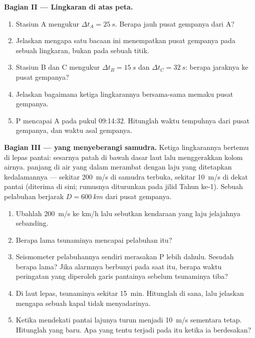 \begin{problem}
\medskip
\noindent\textbf{Bagian II --- Lingkaran di atas peta.}
\begin{enumerate}[resume]
  \item Stasiun A mengukur $\Delta t_A = \qty{25}{s}$. Berapa jauh pusat
        gempanya dari A?
  \item Jelaskan mengapa satu bacaan ini menempatkan pusat gempanya pada
        sebuah lingkaran, bukan pada sebuah titik.
  \item Stasiun B dan C mengukur $\Delta t_B = \qty{15}{s}$ dan
        $\Delta t_C = \qty{32}{s}$: berapa jaraknya ke pusat gempanya?
  \item Jelaskan bagaimana ketiga lingkarannya bersama-sama memaku pusat
        gempanya.
  \item {} P mencapai A pada pukul 09:14:32. Hitunglah waktu
        tempuhnya dari pusat gempanya, dan waktu asal gempanya.
\end{enumerate}

\medskip
\noindent\textbf{Bagian III ---  yang menyeberangi samudra.}
Ketiga lingkarannya bertemu di lepas pantai: sesarnya patah di bawah
dasar laut lalu menggerakkan kolom airnya.  panjang di air yang
dalam merambat dengan laju yang ditetapkan kedalamannya --- sekitar
\qty{200}{m/s} di samudra terbuka, sekitar \qty{10}{m/s} di dekat
pantai (diterima di sini; rumusnya diturunkan pada jilid Tahun ke-1).
Sebuah pelabuhan berjarak $D = \qty{600}{km}$ dari pusat gempanya.
\begin{enumerate}[resume]
  \item Ubahlah \qty{200}{m/s} ke \unit{km/h} lalu sebutkan kendaraan
        yang laju jelajahnya sebanding.
  \item Berapa lama tsunaminya mencapai pelabuhan itu?
  \item Seismometer pelabuhannya sendiri merasakan  P lebih
        dahulu. Sesudah berapa lama? Jika alarmnya berbunyi pada saat
        itu, berapa waktu peringatan yang diperoleh garis pantainya
        sebelum tsunaminya tiba?
  \item Di laut lepas,  tsunaminya sekitar \qty{15}{min}.
        Hitunglah  di sana, lalu jelaskan mengapa
        sebuah kapal tidak menyadarinya.
  \item Ketika mendekati pantai lajunya turun menjadi \qty{10}{m/s}
        sementara  tetap. Hitunglah  yang
        baru. Apa yang tentu terjadi pada  itu ketika ia
        berdesakan?
\end{enumerate}


\end{problem}
